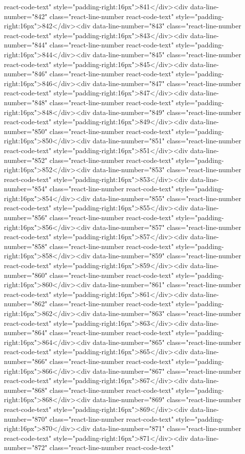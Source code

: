react-code-text" style="padding-right:16px">841</div><div data-line-number="842" class="react-line-number react-code-text" style="padding-right:16px">842</div><div data-line-number="843" class="react-line-number react-code-text" style="padding-right:16px">843</div><div data-line-number="844" class="react-line-number react-code-text" style="padding-right:16px">844</div><div data-line-number="845" class="react-line-number react-code-text" style="padding-right:16px">845</div><div data-line-number="846" class="react-line-number react-code-text" style="padding-right:16px">846</div><div data-line-number="847" class="react-line-number react-code-text" style="padding-right:16px">847</div><div data-line-number="848" class="react-line-number react-code-text" style="padding-right:16px">848</div><div data-line-number="849" class="react-line-number react-code-text" style="padding-right:16px">849</div><div data-line-number="850" class="react-line-number react-code-text" style="padding-right:16px">850</div><div data-line-number="851" class="react-line-number react-code-text" style="padding-right:16px">851</div><div data-line-number="852" class="react-line-number react-code-text" style="padding-right:16px">852</div><div data-line-number="853" class="react-line-number react-code-text" style="padding-right:16px">853</div><div data-line-number="854" class="react-line-number react-code-text" style="padding-right:16px">854</div><div data-line-number="855" class="react-line-number react-code-text" style="padding-right:16px">855</div><div data-line-number="856" class="react-line-number react-code-text" style="padding-right:16px">856</div><div data-line-number="857" class="react-line-number react-code-text" style="padding-right:16px">857</div><div data-line-number="858" class="react-line-number react-code-text" style="padding-right:16px">858</div><div data-line-number="859" class="react-line-number react-code-text" style="padding-right:16px">859</div><div data-line-number="860" class="react-line-number react-code-text" style="padding-right:16px">860</div><div data-line-number="861" class="react-line-number react-code-text" style="padding-right:16px">861</div><div data-line-number="862" class="react-line-number react-code-text" style="padding-right:16px">862</div><div data-line-number="863" class="react-line-number react-code-text" style="padding-right:16px">863</div><div data-line-number="864" class="react-line-number react-code-text" style="padding-right:16px">864</div><div data-line-number="865" class="react-line-number react-code-text" style="padding-right:16px">865</div><div data-line-number="866" class="react-line-number react-code-text" style="padding-right:16px">866</div><div data-line-number="867" class="react-line-number react-code-text" style="padding-right:16px">867</div><div data-line-number="868" class="react-line-number react-code-text" style="padding-right:16px">868</div><div data-line-number="869" class="react-line-number react-code-text" style="padding-right:16px">869</div><div data-line-number="870" class="react-line-number react-code-text" style="padding-right:16px">870</div><div data-line-number="871" class="react-line-number react-code-text" style="padding-right:16px">871</div><div data-line-number="872" class="react-line-number react-code-text" 